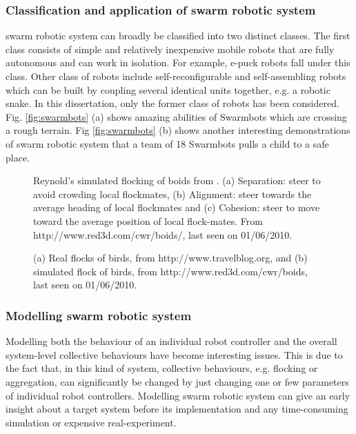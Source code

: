 \subsubsection*{Classification and application of swarm robotic system}
swarm robotic system can broadly be classified into two distinct classes. The first class consists of simple and relatively inexpensive mobile robots that are fully autonomous and can work in isolation. For example, e-puck robots \cite{Cianci+2004} fall under this class. Other class of robots include self-reconfigurable \cite{Fukuda+1987} and self-assembling robots which can be built by coupling several identical units together, e.g. a robotic snake. In this dissertation, only the former class of robots has been considered. Fig. \ref{fig:swarmbots} (a) shows amazing abilities of Swarmbots which are crossing a rough terrain. Fig \ref{fig:swarmbots} (b) shows another interesting demonstrations of swarm robotic system that a team of 18 Swarmbots pulls a child to a safe place.
\begin{figure}
\centering
{} 
\hspace{0.25cm}
\hspace{0.25cm}
\caption{ Reynold's simulated flocking of boids from \protect{}. (a) Separation: steer to avoid crowding local flockmates, (b) Alignment: steer towards the average heading of local flockmates and (c) Cohesion: steer to move toward the average position of local flock-mates. \protect\newline  From http://www.red3d.com/cwr/boids/, last seen on 01/06/2010.}
\label{fig:boid-rules}
\end{figure}
\begin{figure}
\centering
{} 
\hspace{0.25cm}
\caption{ (a) Real flocks of birds, from http://www.travelblog.org, and (b) simulated flock of birds, from http://www.red3d.com/cwr/boids, last seen on 01/06/2010.}
\label{fig:flocking-birds}
\end{figure}
\subsubsection*{Modelling swarm robotic system}
Modelling both the behaviour of an individual robot controller and the overall system-level collective behaviours have become interesting issues. This is due to the fact that, in this kind of system, collective behaviours, e.g. flocking or aggregation, can significantly be changed by just changing one or few parameters of individual robot controllers. Modelling swarm robotic system can give an early insight about a target system before its implementation and any time-consuming simulation or expensive real-experiment.

